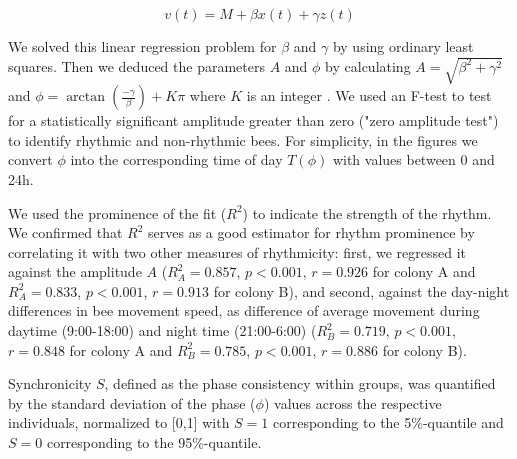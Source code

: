 \documentclass{article}
\begin{document}
\begin{equation}
v(t) = M + \beta x(t) + \gamma z(t)
\end{equation}

We solved this linear regression problem for $\beta$ and $\gamma$ by using ordinary least squares. Then we deduced the parameters $A$ and $\phi$ by calculating $A = \sqrt{\beta^2 + \gamma^2}$ and $\phi = \arctan\left(\frac{-\gamma}{\beta}\right) + K\pi$ where $K$ is an integer \cite{cornelissen_cosinor-based_2014}. We used an F-test \cite{cornelissen_cosinor-based_2014} to test for a statistically significant amplitude greater than zero ("zero amplitude test") to identify rhythmic and non-rhythmic bees. For simplicity, in the figures we convert $\phi$ into the corresponding time of day $T(\phi)$ with values between 0 and 24h.

We used the prominence of the fit ($R^2$) to indicate the strength of the rhythm. We confirmed that $R^2$ serves as a good estimator for rhythm prominence by correlating it with two other measures of rhythmicity: first, we regressed it against the amplitude $A$ ($R_{A}^2 = 0.857$, $p < 0.001$, $r = 0.926$ for colony A and $R_{A}^2 = 0.833$, $p < 0.001$, $r = 0.913$ for colony B), and second, against the day-night differences in bee movement speed, as difference of average movement during daytime (9:00-18:00) and night time (21:00-6:00) ($R_{B}^2 = 0.719$, $p < 0.001$, $r = 0.848$ for colony A and $R_{B}^2 = 0.785$, $p < 0.001$, $r = 0.886$ for colony B).

Synchronicity $S$, defined as the phase consistency within groups, was quantified by the standard deviation of the phase ($\phi$) values across the respective individuals, normalized to [0,1] with $S=1$ corresponding to the 5\%-quantile and $S=0$ corresponding to the 95\%-quantile.
\end{document}
